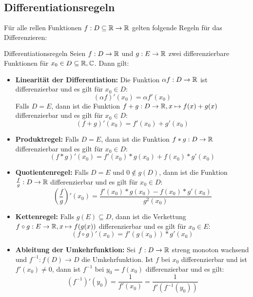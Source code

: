\subsection{Differentiationsregeln}
Für alle rellen Funktionen $f:D\subseteq\mathbb{R}\rightarrow\mathbb{R}$ gelten folgende Regeln für das Differenzieren:
\begin{satz}{Differentiationsregeln}
	Seien $f:D\rightarrow\mathbb{R}$ und $g:E\rightarrow\mathbb{R}$ zwei differenzierbare Funktionen für $x_0\in D\subseteq \mathbb{R},\mathbb{C}$. Dann gilt:
	\begin{itemize}
		\item \textbf{Linearität der Differentiation:}
		Die Funktion $\alpha f:D\rightarrow\mathbb{R}$ ist differenzierbar und es gilt für $x_0\in D$:
		\begin{equation*}
			(\alpha f)'(x_0)=\alpha f'(x_0)
		\end{equation*}
		Falls $D=E$, dann ist die Funktion $f+g:D\rightarrow \mathbb{R},x\mapsto f(x)+g(x)$ differenzierbar und es gilt für $x_0\in D$:
		\begin{equation*}
			(f+g)'(x_0)=f'(x_0)+g'(x_0)
		\end{equation*}
		\item \textbf{Produktregel:}
		Falls $D=E$, dann ist die Funktion $f*g:D\rightarrow\mathbb{R}$ differenzierbar und es gilt für $x_0\in D$:
		\begin{equation*}
			(f*g)'(x_0)=f'(x_0)*g(x_0)+f(x_0)*g'(x_0)
		\end{equation*}
		\item \textbf{Quotientenregel:}
		Falls $D=E$ und $0\not\in g(D)$, dann ist die Funktion $\frac fg:D\rightarrow\mathbb{R}$ differenzierbar und es gilt für $x_0\in D$:
		\begin{equation*}
			\left(\frac fg\right)'(x_0)=\frac{f'(x_0)*g(x_0)-f(x_0)*g'(x_0)}{g^2(x_0)}
		\end{equation*}
		\item \textbf{Kettenregel:}
		Falls $g(E)\subseteq D$, dann ist die Verkettung $f\circ g:E\rightarrow\mathbb{R},x\mapsto f(g(x))$ differenzierbar und es gilt für $x_0\in E$:
		\begin{equation*}
			(f\circ g)'(x_0)=f'(g(x_0))*g'(x_0)
		\end{equation*}
		\item \textbf{Ableitung der Umkehrfunktion:}
		Sei $f:D\rightarrow\mathbb{R}$ streng monoton wachsend und $f^{-1}:f(D)\rightarrow D$ die Umkehrfunktion. Ist $f$ bei $x_0$ differenzierbar und ist $f'(x_0)\neq 0$, dann ist $f^{-1}$ bei $y_0=f(x_0)$ differenzierbar und es gilt:
		\begin{equation*}
			(f^{-1})'(y_0)=\frac{1}{f'(x_0)}=\frac{1}{f'(f^{-1}(y_0))}
		\end{equation*}
	\end{itemize}
\end{satz}
